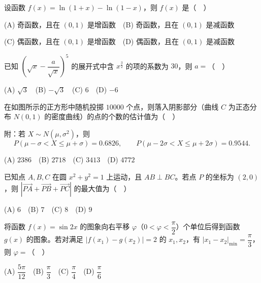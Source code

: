 \begin{question}

设函数 \(f(x)=\ln(1+x)-\ln(1-x)\)，则 \(f(x)\) 是（　）

(A) 奇函数，且在 \((0,1)\) 是增函数　(B) 奇函数，且在 \((0,1)\) 是减函数

(C) 偶函数，且在 \((0,1)\) 是增函数　(D) 偶函数，且在 \((0,1)\) 是减函数

\end{question}
\begin{question}

已知 \(\left(\sqrt{x}-\dfrac{a}{\sqrt{x}}\right)^5\) 的展开式中含 \(x^{\frac32}\) 的项的系数为 \(30\)，则 \(a=\)（　）

(A) \(\sqrt3\)　(B) \(-\sqrt3\)　(C) \(6\)　(D) \(-6\)

\Needspace{0.4\textheight}
\end{question}
\begin{question}

在如图所示的正方形中随机投掷 \(10000\) 个点，则落入阴影部分（曲线 \(C\) 为正态分布 \(N(0,1)\) 的密度曲线）的点的个数的估计值为（　）

附：若 \(X\sim N(\mu,\sigma^2)\)，则
\nopagebreak[4]
\[
P(\mu-\sigma<X\leqslant\mu+\sigma)=0.6826,\qquad
P(\mu-2\sigma<X\leqslant\mu+2\sigma)=0.9544.
\]
\nopagebreak[4]
\begin{center}\end{center}
\nopagebreak[4]
(A) \(2386\)　(B) \(2718\)　(C) \(3413\)　(D) \(4772\)

\end{question}
\begin{question}

已知点 \(A,B,C\) 在圆 \(x^2+y^2=1\) 上运动，且 \(AB\perp BC\)。若点 \(P\) 的坐标为 \((2,0)\)，则 \(\left|\overrightarrow{PA}+\overrightarrow{PB}+\overrightarrow{PC}\right|\) 的最大值为（　）

(A) \(6\)　(B) \(7\)　(C) \(8\)　(D) \(9\)

\end{question}
\begin{question}

将函数 \(f(x)=\sin 2x\) 的图象向右平移 \(\varphi\)（\(0<\varphi<\dfrac{\pi}{2}\)）个单位后得到函数 \(g(x)\) 的图象。若对满足 \(\lvert f(x_1)-g(x_2)\rvert=2\) 的 \(x_1,x_2\)，有 \(\lvert x_1-x_2\rvert_{\min}=\dfrac{\pi}{3}\)，则 \(\varphi=\)（　）

(A) \(\dfrac{5\pi}{12}\)　(B) \(\dfrac{\pi}{3}\)　(C) \(\dfrac{\pi}{4}\)　(D) \(\dfrac{\pi}{6}\)

\Needspace{0.4\textheight}
\end{question}
